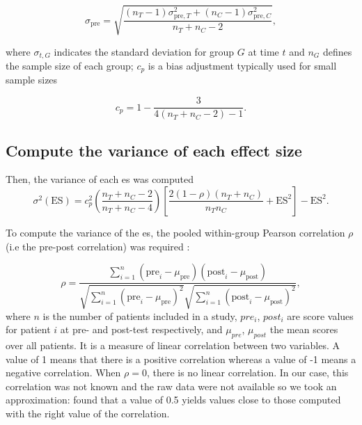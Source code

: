 \documentclass[12pt,a4paper,english]{article}
\begin{document}
\begin{equation}
\label{eq:stats_metareview_std_pre}
\sigma_{\text{pre}} = \sqrt{\frac{(n_T - 1)\sigma_{\text{pre},T}^2 + (n_C - 1)\sigma_{\text{pre},C}^2} {n_T + n_C - 2}},
\end{equation}

where $\sigma_{t,G}$ indicates the standard deviation for group $G$ at time $t$ and $n_G$ defines the sample size of each group; 
$c_p$ is a bias adjustment typically used for small sample sizes

\begin{equation}
\label{eq:metareview_correction_factor}
c_p =  1 - \frac{3} {4(n_T + n_C - 2) - 1}. 
\end{equation} 

\subsection{Compute the variance of each effect size}

Then, the variance of each \gls{es} was computed \citep{Morris2008}
\begin{equation}
\label{eq:metareview_variance_ES}
\sigma^2(\text{ES}) = c_p^2 \left (\frac{n_T + n_C - 2} {n_T + n_C - 4} \right ) \left  [ \frac{2(1-\rho)(n_T + n_C)} {n_Tn_C} + \text{ES}^2 \right ] - \text{ES}^2.
\end{equation} 

To compute the variance of the \gls{es}, the pooled within-group Pearson correlation $\rho$ (i.e the pre-post correlation) was required 
\citep{James2013}:

\begin{equation}
\label{eq:metareview_within_group_pearson_correlation}
\rho =  \frac{ \sum_{i=1}^{n} (\text{pre}_i - \mu_{\text{pre}})(\text{post}_i - \mu_{\text{post}}) } { \sqrt{ \sum_{i=1}^{n} (\text{pre}_i - \mu_{\text{pre}})^2} \sqrt{\sum_{i=1}^{n} (\text{post}_i - \mu_{\text{post}})^2} }, 
\end{equation}
where $n$ is the number of patients included in a study, $pre_i$, $post_i$ are score values for patient $i$ at pre- and post-test 
respectively, and $\mu_{pre}$, $\mu_{post}$ the mean scores over all patients. It is a measure of linear correlation between two variables. 
A value of 1 means that there is a positive correlation whereas a value of -1 means a negative correlation. When $\rho=0$, there is no
linear correlation. In our case, this correlation was not known and the raw data were not available so we took an
approximation: \citet{Balk2012} found that a value of 0.5 yields values close to those computed with the right value of the correlation. 
\end{document}
